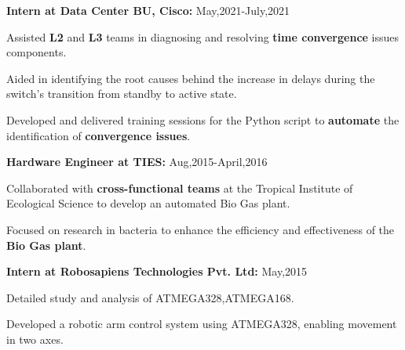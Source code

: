 \documentclass[10pt]{article}
\begin{document}
\textbf{Intern at  Data Center BU, Cisco:} 
\hfill May,2021-July,2021
\begin{compactitem}
\item Assisted \textbf{L2} and \textbf{L3} teams in diagnosing and resolving \textbf{time convergence} issues components.
\item Aided in identifying the root causes behind the increase in delays during the switch's transition from standby to active state.
\item Developed and delivered training sessions for the Python script to \textbf{automate} the identification of \textbf{convergence issues}.\end{compactitem}

\textbf{ Hardware Engineer at TIES:}
\hfill Aug,2015-April,2016
\begin{compactitem}
\item Collaborated with \textbf{cross-functional teams} at the Tropical Institute of Ecological Science to develop an automated Bio Gas plant.
\item Focused on research in bacteria to enhance the efficiency and effectiveness of the \textbf{Bio Gas plant}.
\end{compactitem}
\textbf{Intern at Robosapiens Technologies Pvt. Ltd:} 
\hfill May,2015
\begin{compactitem}
\item Detailed study and analysis of ATMEGA328,ATMEGA168. 
\item Developed a robotic arm control system using ATMEGA328, enabling movement in two axes.  
\end{compactitem}
\vspace{-6pt}
\end{document}
